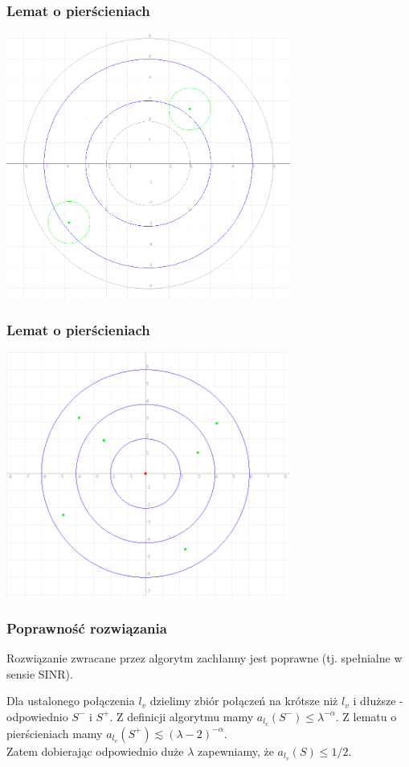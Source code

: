 \documentclass[polish, t,10pt]{beamer}
\begin{document}
\begin{frame}
    \frametitle{Lemat o pierścieniach}
    \centering
    \includegraphics[width=0.7\textwidth]{pictures/bigger-rings.png}
\end{frame}

\begin{frame}
    \frametitle{Lemat o pierścieniach}
    \centering
    \includegraphics[width=0.7\textwidth]{pictures/rings.png}
\end{frame}

\begin{frame}
    \frametitle{Poprawność rozwiązania}
    \begin{lemma}
        Rozwiązanie zwracane przez algorytm zachłanny jest poprawne (tj. spełnialne w sensie SINR).
    \end{lemma}
    Dla ustalonego połączenia $l_v$ dzielimy zbiór połączeń na krótsze niż $l_v$ i dłuższe - odpowiednio $S^{-}$ i $S^{+}$.
    Z definicji algorytmu mamy $a_{l_v}(S^{-}) \le \lambda^{-\alpha}$. Z lematu o pierścieniach mamy
    $a_{l_v}(S^{+}) \lesssim (\lambda - 2)^{-\alpha}$. \\
    Zatem dobierając odpowiednio duże $\lambda$ zapewniamy, że $a_{l_v}(S) \le 1/2$.
\end{frame}
\end{document}
